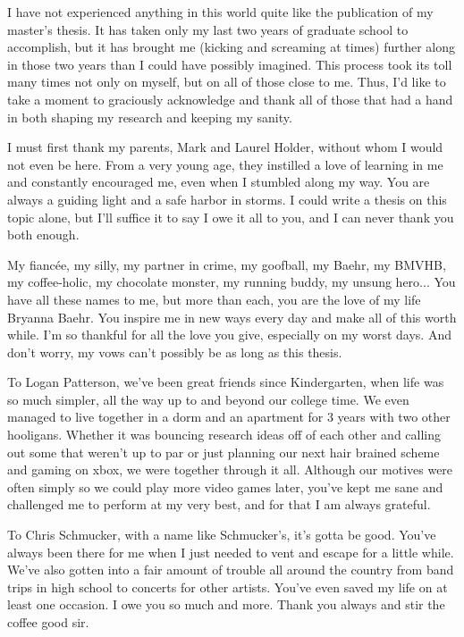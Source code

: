\documentclass[12pt]{report}
\begin{document}
\thispagestyle{empty}

I have not experienced anything in this world quite like the publication of my master's thesis. It has taken only my last two years of graduate school to accomplish, but it has brought me (kicking and screaming at times) further along in those two years than I could have possibly imagined. This process took its toll many times not only on myself, but on all of those close to me. Thus, I'd like to take a moment to graciously acknowledge and thank all of those that had a hand in both shaping my research and keeping my sanity.

I must first thank my parents, Mark and Laurel Holder, without whom I would not even be here. From a very young age, they instilled a love of learning in me and constantly encouraged me, even when I stumbled along my way. You are always a guiding light and a safe harbor in storms. I could write a thesis on this topic alone, but I'll suffice it to say I owe it all to you, and I can never thank you both enough.

My fianc\'ee, my silly, my partner in crime, my goofball, my Baehr, my BMVHB, my coffee-holic, my chocolate monster, my running buddy, my unsung hero... You have all these names to me, but more than each, you are the love of my life Bryanna Baehr. You inspire me in new ways every day and make all of this worth while. I'm so thankful for all the love you give, especially on my worst days. And don't worry, my vows can't possibly be as long as this thesis.

To Logan Patterson, we've been great friends since Kindergarten, when life was so much simpler, all the way up to and beyond our college time. We even managed to live together in a dorm and an apartment for 3 years with two other hooligans. Whether it was bouncing research ideas off of each other and calling out some that weren't up to par or just planning our next hair brained scheme and gaming on xbox, we were together through it all. Although our motives were often simply so we could play more video games later, you've kept me sane and challenged me to perform at my very best, and for that I am always grateful.

To Chris Schmucker, with a name like Schmucker's, it's gotta be good. You've always been there for me when I just needed to vent and escape for a little while. We've also gotten into a fair amount of trouble all around the country from band trips in high school to concerts for other artists. You've even saved my life on at least one occasion. I owe you so much and more. Thank you always and stir the coffee good sir.
\end{document}
